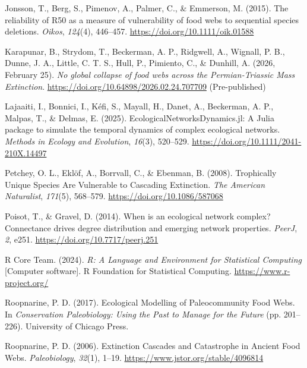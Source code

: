 \documentclass[
]{article}
\newlength{\cslhangindent}
\newenvironment{CSLReferences}[2] %
 {\begin{list}{}{%
  \setlength{\itemindent}{0pt}
  \setlength{\leftmargin}{0pt}
  \setlength{\parsep}{0pt}
  \ifodd #1
   \setlength{\leftmargin}{\cslhangindent}
   \setlength{\itemindent}{-1\cslhangindent}
  \fi
  \setlength{\itemsep}{#2\baselineskip}}}
 {\end{list}}
\begin{document}
\begin{CSLReferences}{1}{0}
Jonsson, T., Berg, S., Pimenov, A., Palmer, C., \& Emmerson, M. (2015).
The reliability of {R50} as a measure of vulnerability of food webs to
sequential species deletions. \emph{Oikos}, \emph{124}(4), 446--457.
\url{https://doi.org/10.1111/oik.01588}

Karapunar, B., Strydom, T., Beckerman, A. P., Ridgwell, A., Wignall, P.
B., Dunne, J. A., Little, C. T. S., Hull, P., Pimiento, C., \& Dunhill,
A. (2026, February 25). \emph{No global collapse of food webs across the
{Permian-Triassic Mass Extinction}}.
\url{https://doi.org/10.64898/2026.02.24.707709} (Pre-published)

Lajaaiti, I., Bonnici, I., Kéfi, S., Mayall, H., Danet, A., Beckerman,
A. P., Malpas, T., \& Delmas, E. (2025).
{EcologicalNetworksDynamics}.jl: {A Julia} package to simulate the
temporal dynamics of complex ecological networks. \emph{Methods in
Ecology and Evolution}, \emph{16}(3), 520--529.
\url{https://doi.org/10.1111/2041-210X.14497}

Petchey, O. L., Eklöf, A., Borrvall, C., \& Ebenman, B. (2008).
Trophically {Unique Species Are Vulnerable} to {Cascading Extinction}.
\emph{The American Naturalist}, \emph{171}(5), 568--579.
\url{https://doi.org/10.1086/587068}

Poisot, T., \& Gravel, D. (2014). When is an ecological network complex?
{Connectance} drives degree distribution and emerging network
properties. \emph{PeerJ}, \emph{2}, e251.
\url{https://doi.org/10.7717/peerj.251}

R Core Team. (2024). \emph{R: {A Language} and {Environment} for
{Statistical Computing}} {[}Computer software{]}. R Foundation for
Statistical Computing. \url{https://www.r-project.org/}

Roopnarine, P. D. (2017). Ecological {Modelling} of {Paleocommunity Food
Webs}. In \emph{Conservation {Paleobiology}: {Using} the {Past} to
{Manage} for the {Future}} (pp. 201--226). University of Chicago Press.

Roopnarine, P. D. (2006). Extinction {Cascades} and {Catastrophe} in
{Ancient Food Webs}. \emph{Paleobiology}, \emph{32}(1), 1--19.
\url{https://www.jstor.org/stable/4096814}


\end{CSLReferences}
\end{document}
